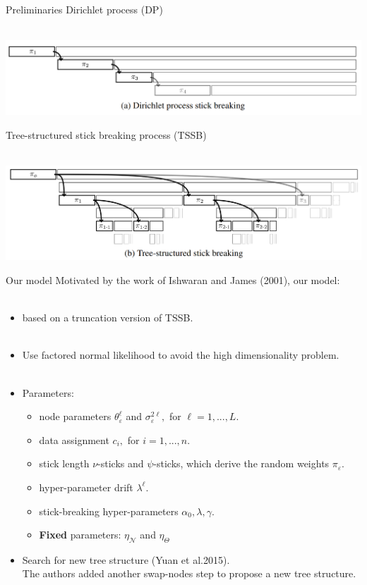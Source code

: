 \documentclass[10 pt]{beamer}
\begin{document}
\begin{frame}{Preliminaries}
Dirichlet process (DP)\\
~\\
\centerline{\includegraphics[scale=0.4]{figs/DP.png}}
Tree-structured stick breaking process (TSSB)\\
~\\
\centerline{\includegraphics[scale=0.4]{figs/TSSB.png}}
\end{frame}



\begin{frame}{Our model}
Motivated by the work of Ishwaran and James (2001), our model:
~\\
~\\
\begin{itemize}
\item based on a truncation version of TSSB.
~\\
~\\
\item Use factored normal likelihood to avoid the high dimensionality problem.
~\\
~\\
\item Parameters:\\
\begin{itemize}
	\item node parameters $\theta_{\varepsilon}^\ell$ and $\sigma_{\varepsilon}^{2\ell},$ for $\ell = 1,...,L$.
	\item data assignment $c_i,$ for $i=1,...,n$.
	\item stick length $\nu$-sticks and $\psi$-sticks, which derive the random weights $\pi_\varepsilon$.
	\item hyper-parameter drift $\lambda^\ell.$ 
	\item stick-breaking hyper-parameters $\alpha_0,\lambda,\gamma$.
	\item \textbf{Fixed} parameters: $\eta_{\mathcal{N}}$ and $\eta_{\Theta}$
\end{itemize}

\item Search for new tree structure (Yuan et al.2015).\\
The authors added another swap-nodes step to propose a new tree structure.

\end{itemize}
\end{frame}
\end{document}
